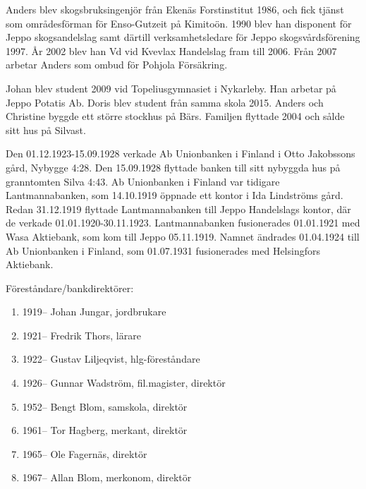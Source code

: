Anders blev skogsbruksingenjör från Ekenäs Forstinstitut 1986, och fick tjänst som områdesförman för Enso-Gutzeit på Kimitoön. 1990 blev han disponent för Jeppo skogsandelslag samt därtill verksamhetsledare för Jeppo skogsvårdsförening 1997. År 2002 blev han Vd vid Kvevlax Handelslag fram till 2006. Från 2007 arbetar Anders som ombud för Pohjola Försäkring.
\begin{jhchildren}
  \item {}
  \item {}
\end{jhchildren}
Johan blev student 2009 vid Topeliusgymnasiet i Nykarleby. Han arbetar på Jeppo Potatis Ab. Doris blev student från samma skola 2015.  Anders och Christine byggde ett större stockhus på Bärs. Familjen flyttade 2004 och sålde sitt hus på Silvast.


Den 01.12.1923-15.09.1928 verkade Ab Unionbanken i Finland i Otto Jakobssons gård, Nybygge 4:28. Den 15.09.1928 flyttade banken till sitt nybyggda hus på granntomten Silva 4:43. Ab Unionbanken i Finland var tidigare Lantmannabanken, som 14.10.1919 öppnade ett kontor i Ida Lindströms gård. Redan 31.12.1919 flyttade Lantmannabanken till Jeppo Handelslags kontor, där de verkade 01.01.1920-30.11.1923. Lantmannabanken fusionerades 01.01.1921 med Wasa Aktiebank, som kom till Jeppo 05.11.1919. Namnet ändrades 01.04.1924 till Ab Unionbanken i Finland, som 01.07.1931 fusionerades med Helsingfors Aktiebank.

Föreståndare/bankdirektörer:
\begin{enumerate}
  \item 1919--	Johan Jungar,	jordbrukare
  \item 1921--	Fredrik Thors, lärare
  \item 1922--	Gustav Liljeqvist, hlg-föreståndare
  \item 1926--	Gunnar Wadström, fil.magister, direktör
  \item 1952--	Bengt Blom, samskola, direktör
  \item 1961--	Tor Hagberg, merkant, direktör
  \item 1965--	Ole Fagernäs, direktör
  \item 1967--	Allan Blom,	merkonom, direktör
\end{enumerate}

